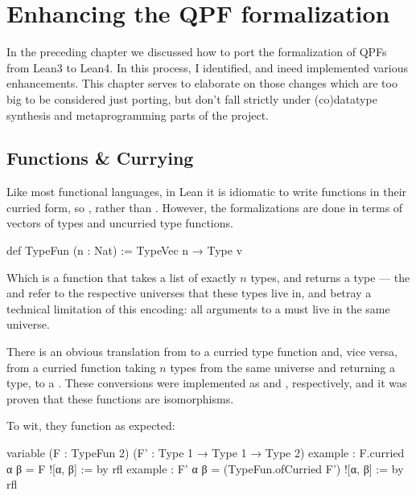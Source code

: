 
\chapter{Enhancing the QPF formalization}
\label{ch:enhancing}


In the preceding chapter we discussed how to port the formalization of QPFs from Lean3 to Lean4.
In this process, I identified, and ineed implemented various enhancements. 
This chapter serves to elaborate on those changes which are too big to be considered just porting, but don't fall strictly under (co)datatype synthesis and metaprogramming parts of the project.






\section{Functions \& Currying}
Like most functional languages, in Lean it is idiomatic to write functions in their curried form, 
so , rather than .
However, the formalizations are done in terms of vectors of types and uncurried type functions.

\begin{leancode}
    def TypeFun (n : Nat)
      := TypeVec n → Type v
\end{leancode}
Which is a function that takes a list of exactly $n$ types, and returns a type --- the  and
 refer to the respective universes that these types live in, and betray a technical limitation
of this encoding: all arguments to a  must live in the same universe.

There is an obvious translation from  to a curried type function and, vice versa, from a curried function taking $n$ types from the same universe and returning a type, to a .
These conversions were implemented as  and , respectively, and it was proven that these functions are isomorphisms. 

To wit, they function as expected:
\begin{leancode}
    variable (F : TypeFun 2) (F' : Type 1 → Type 1 → Type 2)
    example : F.curried α β = F ![α, β]                 := by rfl
    example : F' α β = (TypeFun.ofCurried F') ![α, β]   := by rfl
\end{leancode}

